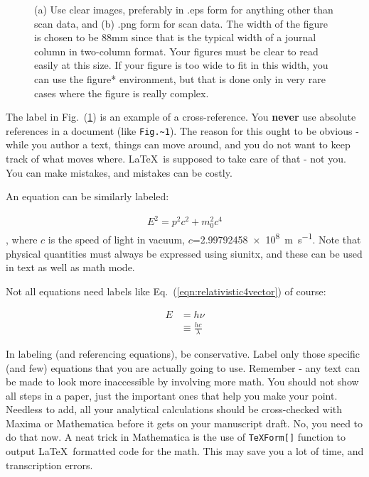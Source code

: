 \documentclass[12 pt]{article}
\begin{document}
\begin{figure}
\centering
{}
\caption{(a) Use clear images, preferably in .eps form for anything other than scan data, and (b) .png form for scan data. The width of the figure is chosen to be 88mm since that is the typical width of a journal column in two-column format. Your figures must be clear to read easily at this size. If your figure is too wide to fit in this width, you can use the figure* environment, but that is done only in very rare cases where the figure is really complex.}
\label{fig:cv}
\end{figure}

The label in Fig.~(\ref{fig:cv}) is an example of a cross-reference. You \textbf{never} use absolute references in a document (like \verb|Fig.~1|). The reason for this ought to be obvious - while you author a text, things can move around, and you do not want to keep track of what moves where. \LaTeX\ is supposed to take care of that - not you. You can make mistakes, and mistakes can be costly.

An equation can be similarly labeled:

\begin{align}
  E^{2} = p^{2} c^{2} + m_{0}^{2} c^{4} \label{eqn:relativistic4vector}
\end{align}
, where $c$ is the speed of light in vacuum, $c$=\qty{2.99792458e8}{\meter\per\second}. Note that physical quantities must always be expressed using siunitx, and these can be used in text as well as math mode.

Not all equations need labels like Eq.~(\ref{eqn:relativistic4vector}) of course:

\begin{align}
  E & = h\nu \nonumber \\
  & \equiv \frac{h c}{\lambda} \label{eqn:plancksrelationship}
\end{align}

In labeling (and referencing equations), be conservative. Label only those specific (and few) equations that you are actually going to use. Remember - any text can be made to look more inaccessible by involving more math. You should not show all steps in a paper, just the important ones that help you make your point. Needless to add, all your analytical calculations should be cross-checked with Maxima or Mathematica before it gets on your manuscript draft. No, you need to do that now. A neat trick in Mathematica is the use of \verb|TeXForm[]| function to output \LaTeX\ formatted code for the math. This may save you a lot of time, and transcription errors.
\end{document}
